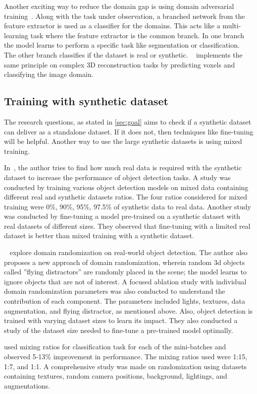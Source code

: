 Another exciting way to reduce the domain gap is using domain adversarial training~\cite{ganin2016domainadversarial}.
Along with the task under observation, a branched network from the feature extractor is used as a classifier for the domains.
This acts like a multi-learning task where the feature extractor is the common branch.
In one branch the model learns to perform a specific task like segmentation or classification.
The other branch classifies if the dataset is real or synthetic.
~\cite{pinheiro2019domainadaptive} implements the same principle on complex 3D reconstruction tasks by predicting voxels and classifying the image domain.

\subsection{Training with synthetic dataset}\label{subsec:training-with-synthetic-dataset}
The research questions, as stated in \autoref{sec:goal} aims to check if a synthetic dataset can deliver as a standalone dataset.
If it does not, then techniques like fine-tuning will be helpful.
Another way to use the large synthetic datasets is using mixed training.

In~\cite{nowruzi2019real},  the author tries to find how much real data is required with the synthetic dataset to increase the performance of object detection tasks.
A study was conducted by training various object detection models on mixed data containing different real and synthetic datasets ratios.
The four ratios considered for mixed training were 0\%, 90\%, 95\%, 97.5\% of synthetic data to real data.
Another study was conducted by fine-tuning a model pre-trained on a synthetic dataset with real datasets of different sizes.
They observed that fine-tuning with a limited real dataset is better than mixed training with a synthetic dataset.

~\cite{Tremblay2018TrainingDN}  explore domain randomization on real-world object detection.
The author also proposes a new approach of domain randomization, wherein random 3d objects called ”flying distractors” are randomly placed in the scene;
the model learns to ignore objects that are not of interest.
A focused ablation study with individual domain randomization parameters was also conducted to understand the contribution of each component.
The parameters included lights, textures, data augmentation, and flying distractor, as mentioned above.
Also, object detection is trained with varying dataset sizes to learn its impact.
They also conducted a study of the dataset size needed to fine-tune a pre-trained model optimally.

\cite{2018LearningIC} used mixing ratios for classification task for each of the mini-batches and observed 5-13\% improvement in performance.
The mixing ratios used were 1:15, 1:7, and 1:1.
A comprehensive study was made on randomization using datasets containing textures, random camera positions, background, lightings, and augmentations.


